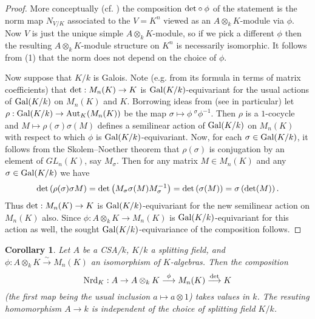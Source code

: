 \documentclass[11pt]{amsart}
\numberwithin{equation}{section}
\newtheorem{cor}[equation]{Corollary}
\theoremstyle{remark}
\theoremstyle{remark}
\theoremstyle{remark}
\theoremstyle{definition}
\theoremstyle{definition}
\theoremstyle{definition}
\theoremstyle{definition}
\theoremstyle{definition}
\theoremstyle{definition}
\begin{document}
\begin{proof}
More conceptually (cf. ) the composition  $\textup{det}\circ \phi$ of the statement is the norm map $N_{V/K}$ associated to the  $V=K^n$ viewed as an $A\otimes_k K$-module via $\phi$.  Now $V$ is just the unique simple $A\otimes_k K$-module, so if we pick a different $\phi$ then the resulting $A\otimes_k K$-module structure on  $K^n$ is necessarily isomorphic. It follows from   (1) that the norm does not depend on the choice of $\phi$. 

Now suppose that $K/k$ is Galois. Note (e.g. from its formula in terms of matrix coefficients) that $\textup{det}:M_n(K)\rightarrow K$ is $\textup{Gal}(K/k)$-equivariant for the usual actions of $\textup{Gal}(K/k)$ on $M_n(K)$ and $K$. Borrowing ideas from  (see  in particular) let $\rho:\textup{Gal}(K/k)\rightarrow \textup{Aut}_K(M_n(K))$ be the map $\sigma \mapsto \phi~^\sigma \phi^{-1}$. Then $\rho$ is a $1$-cocycle and $M\mapsto \rho(\sigma)\sigma(M)$ defines a semilinear action of $\textup{Gal}(K/k)$ on $M_n(K)$ with respect to which $\phi$ is $\textup{Gal}(K/k)$-equivariant. Now, for each $\sigma \in \textup{Gal}(K/k)$, it follows from the Skolem--Noether theorem that $\rho(\sigma)$  is conjugation by an element of $GL_n(K)$, say $M_\sigma$. Then for any matrix $M\in M_n(K)$ and any $\sigma \in \textup{Gal}(K/k)$ we have
\[\textup{det}\left( \rho(\sigma)\sigma M\right)=\textup{det}\left(M_\sigma \sigma(M) M_\sigma^{-1}\right)=\textup{det}\left(\sigma(M)\right)=\sigma\left(\textup{det}(M)\right).\]
Thus  $\textup{det}:M_n(K)\rightarrow K$ is $\textup{Gal}(K/k)$-equivariant for the new semilinear action on $M_n(K)$ also. Since $\phi:A\otimes_kK\rightarrow M_n(K)$ is $\textup{Gal}(K/k)$-equivariant for this action as well, the sought $\textup{Gal}(K/k)$-equivariance of the composition follows.
\end{proof}

\begin{cor} \label{independence of field for nrd}
Let $A$ be a CSA/$k$, $K/k$ a splitting field, and $\phi:A\otimes_k K\stackrel{\sim}{\longrightarrow}M_n(K)$ an isomorphism of $K$-algebras. Then the composition
\[\textup{Nrd}_K:A\rightarrow A\otimes_kK \stackrel{\phi}{\longrightarrow}M_n(K)\stackrel{\textup{det}}{\longrightarrow}K\]
(the first map being the usual inclusion $a\mapsto a\otimes 1$)
takes values in $k$. The resuting homomorphism $A\rightarrow k$ is independent of the choice of splitting field $K/k$. 
\end{cor}
\end{document}
